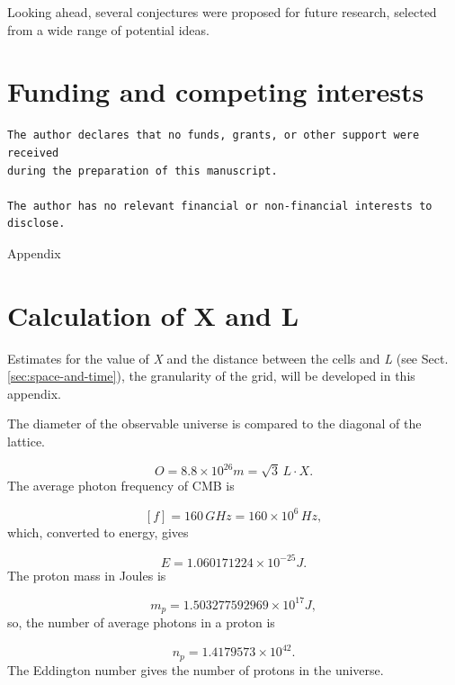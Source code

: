 \documentclass[12pt,english]{article}
\begin{document}
Looking ahead, several conjectures were proposed for future research, selected from a wide range of potential ideas.


\section*{Funding and competing interests}
\begin{verbatim}
The author declares that no funds, grants, or other support were received 
during the preparation of this manuscript.

The author has no relevant financial or non-financial interests to disclose.
\end{verbatim}

\printbibliography


\newpage{}


\appendix
\begin{center}
{\LARGE{}Appendix}{\LARGE\par}
\par\end{center}

\section{Calculation of X and L\label{sec:Calculation-of-X}}

Estimates for the value of \emph{X} and the distance between the cells
and \emph{L} (see Sect. \ref{sec:space-and-time}), the granularity
of the grid, will be developed in this appendix.

The diameter of the observable universe \cite{halpbern} is compared
to the diagonal of the lattice.

\begin{equation}
O=8.8\times10^{26}m=\sqrt{3}\,L\cdot X.\label{eq:obs}
\end{equation}
The average photon frequency of CMB \cite{archeops} is

\[
[f]=160\,GHz=160\times10^{6}\,Hz,
\]
which, converted to energy, gives

\[
E=1.060171224\times10^{-25}J.
\]
The proton mass in Joules is

\[
m_{p}=1.503277592969\times10^{17}J,
\]
so, the number of average photons in a proton is

\[
n_{p}=1.4179573\times10^{42}.
\]
The Eddington number gives the number of protons in the universe.
\end{document}
